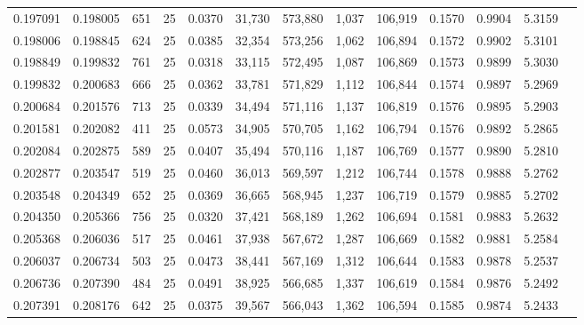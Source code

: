 \begin{tabular}{rrrrrrrrrrrrr}
0.197091 & 0.198005 &   651 &  25 &                                     0.0370 &  31,730 & 573,880 &   1,037 & 106,919 & 0.1570 & 0.9904 & 5.3159 \\
0.198006 & 0.198845 &   624 &  25 &                                     0.0385 &  32,354 & 573,256 &   1,062 & 106,894 & 0.1572 & 0.9902 & 5.3101 \\
0.198849 & 0.199832 &   761 &  25 &                                     0.0318 &  33,115 & 572,495 &   1,087 & 106,869 & 0.1573 & 0.9899 & 5.3030 \\
0.199832 & 0.200683 &   666 &  25 &                                     0.0362 &  33,781 & 571,829 &   1,112 & 106,844 & 0.1574 & 0.9897 & 5.2969 \\
0.200684 & 0.201576 &   713 &  25 &                                     0.0339 &  34,494 & 571,116 &   1,137 & 106,819 & 0.1576 & 0.9895 & 5.2903 \\
0.201581 & 0.202082 &   411 &  25 &                                     0.0573 &  34,905 & 570,705 &   1,162 & 106,794 & 0.1576 & 0.9892 & 5.2865 \\
0.202084 & 0.202875 &   589 &  25 &                                     0.0407 &  35,494 & 570,116 &   1,187 & 106,769 & 0.1577 & 0.9890 & 5.2810 \\
0.202877 & 0.203547 &   519 &  25 &                                     0.0460 &  36,013 & 569,597 &   1,212 & 106,744 & 0.1578 & 0.9888 & 5.2762 \\
0.203548 & 0.204349 &   652 &  25 &                                     0.0369 &  36,665 & 568,945 &   1,237 & 106,719 & 0.1579 & 0.9885 & 5.2702 \\
0.204350 & 0.205366 &   756 &  25 &                                     0.0320 &  37,421 & 568,189 &   1,262 & 106,694 & 0.1581 & 0.9883 & 5.2632 \\
0.205368 & 0.206036 &   517 &  25 &                                     0.0461 &  37,938 & 567,672 &   1,287 & 106,669 & 0.1582 & 0.9881 & 5.2584 \\
0.206037 & 0.206734 &   503 &  25 &                                     0.0473 &  38,441 & 567,169 &   1,312 & 106,644 & 0.1583 & 0.9878 & 5.2537 \\
0.206736 & 0.207390 &   484 &  25 &                                     0.0491 &  38,925 & 566,685 &   1,337 & 106,619 & 0.1584 & 0.9876 & 5.2492 \\
0.207391 & 0.208176 &   642 &  25 &                                     0.0375 &  39,567 & 566,043 &   1,362 & 106,594 & 0.1585 & 0.9874 & 5.2433 \\

\end{tabular}
